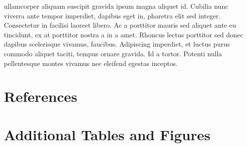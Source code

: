 \documentclass[
  12pt,
]{article}
\newlength{\cslhangindent}
\newlength{\cslentryspacingunit} %
\newenvironment{CSLReferences}[2] %
 {%
  \setlength{\parindent}{0pt}
  \ifodd #1
  \let\oldpar\par
  \def\par{\hangindent=\cslhangindent\oldpar}
  \fi
  \setlength{\parskip}{#2\cslentryspacingunit}
 }%
 {}
\newcommand{\beginsupplement}{\setcounter{table}{0}  \renewcommand{\thetable}{A\arabic{table}}     \setcounter{figure}{0} \renewcommand{\thefigure}{A\arabic{figure}}}
\begin{document}
ullamcorper aliquam suscipit gravida ipsum magna aliquet id. Cubilia nunc viverra ante tempor imperdiet, dapibus eget in, pharetra elit sed integer. Consectetur in facilisi laoreet libero. Ac a porttitor mauris sed aliquet ante eu tincidunt, ex at porttitor nostra a in a amet. Rhoncus lectus porttitor sed donec dapibus scelerisque vivamus, faucibus. Adipiscing imperdiet, et luctus purus commodo aliquet taciti, tempus ornare gravida. Id a tortor. Potenti nulla pellentesque montes vivamus nec eleifend egestas inceptos.

\hypertarget{references}{%
\section*{References}\label{references}}

\hypertarget{refs}{}
\begin{CSLReferences}{0}{0}
\end{CSLReferences}

\clearpage

\hypertarget{appendix-appendix}{%
\appendix}


\beginsupplement

\hypertarget{additional-tables-and-figures}{%
\section{Additional Tables and Figures}\label{additional-tables-and-figures}}
\end{document}
